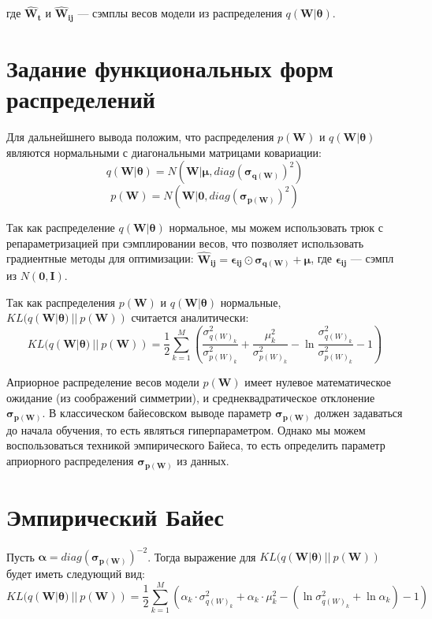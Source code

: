 \documentclass{article}
\begin{document}
где $\pmb{\hat{W}_{t}}$ и $\pmb{\hat{W}_{ij}}$ --- сэмплы весов модели из распределения $q(\pmb{W} | \pmb{\theta})$.

\section{Задание функциональных форм распределений}

Для дальнейшнего вывода положим, что распределения $p(\pmb{W})$ и $q(\pmb{W} | \pmb{\theta})$ являются нормальными с диагональными матрицами ковариации:
\[
 q(\pmb{W} | \pmb{\theta}) = N(\pmb{W} | \pmb{\mu}, diag(\pmb{\sigma_{q(\pmb{W})}})^{2})
\]
\[
 p(\pmb{W}) = N(\pmb{W} | \pmb{0}, diag(\pmb{\sigma_{p(\pmb{W})}})^{2})
\]

Так как распределение $q(\pmb{W} | \pmb{\theta})$ нормальное, мы можем использовать трюк с репараметризацией при сэмплировании весов, что позволяет использовать градиентные методы для оптимизации:
$
\pmb{\hat{W}_{ij}} = \pmb{\epsilon_{ij}}  \odot \pmb{\sigma_{q(\pmb{W})}} + \pmb{\mu}
$, где $\pmb{\epsilon_{ij}}$ --- сэмпл из $N(\pmb{0}, \pmb{I})$.

Так как распределения $p(\pmb{W})$ и $q(\pmb{W} | \pmb{\theta})$ нормальные, $KL(q(\pmb{W} | \pmb{\theta})~||~p(\pmb{W}))$ считается аналитически:
\[
KL(q(\pmb{W} | \pmb{\theta})~||~p(\pmb{W})) =
\dfrac{1}{2}\sum_{k=1}^{M}(\dfrac{\sigma_{{q(W)_{k}}}^2}{\sigma_{{p(W)_{k}}}^2} + \dfrac{\mu_{k}^2}{\sigma_{{p(W)_{k}}}^2} - \ln{\dfrac{\sigma_{{q(W)_{k}}}^2}{\sigma_{{p(W)_{k}}}^2}} - 1)
\]

Априорное распределение весов модели $p(\pmb{W})$ имеет нулевое математическое ожидание (из соображений симметрии), и среднеквадратическое отклонение $\pmb{\sigma_{p(\pmb{W})}}$. В классическом байесовском выводе параметр $\pmb{\sigma_{p(\pmb{W})}}$ должен задаваться до начала обучения, то есть являться гиперпараметром. Однако мы можем воспользоваться техникой эмпирического Байеса, то есть определить параметр  априорного распределения $\pmb{\sigma_{p(\pmb{W})}}$ из данных.

\section{Эмпирический Байес}
Пусть $\pmb{\alpha} = diag(\pmb{\sigma_{p(\pmb{W})}})^{-2}$. Тогда выражение для $KL(q(\pmb{W} | \pmb{\theta})~||~p(\pmb{W}))$ будет иметь следующий вид:
\[
KL(q(\pmb{W} | \pmb{\theta})~||~p(\pmb{W})) =
\dfrac{1}{2}\sum_{k=1}^{M}( \alpha_{k} \cdot \sigma_{{q(W)_{k}}}^2 + \alpha_{k} \cdot \mu_{k}^2 - (\ln{\sigma_{{q(W)_{k}}}^2} + \ln{\alpha_{k}}) - 1)
\]
\end{document}
